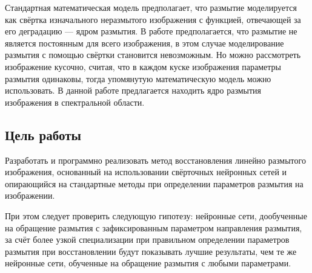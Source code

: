 Стандартная математическая модель предполагает, что размытие моделируется как свёртка изначального неразмытого изображения с функцией, отвечающей за его деградацию --- ядром размытия.
В работе предполагается, что размытие не является постоянным для всего изображения, в этом случае 
моделирование размытия с помощью свёртки становится невозможным. 
Но можно рассмотреть изображение кусочно, считая, что в каждом куске изображения параметры размытия одинаковы, тогда упомянутую математическую модель можно использовать.
В данной работе предлагается находить ядро размытия изображения в спектральной области. 
\par

\subsection{Цель работы}
Разработать и программно реализовать метод восстановления линейно размытого изображения, основанный на использовании свёрточных нейронных сетей и опирающийся на стандартные методы при определении параметров размытия на изображении.
\par
При этом следует проверить следующую гипотезу: нейронные сети, дообученные на обращение размытия с зафиксированным параметром направления размытия, за счёт более узкой специализации при правильном определении параметров размытия при восстановлении будут показывать лучшие результаты, чем те же нейронные сети, обученные на обращение размытия с любыми параметрами.

